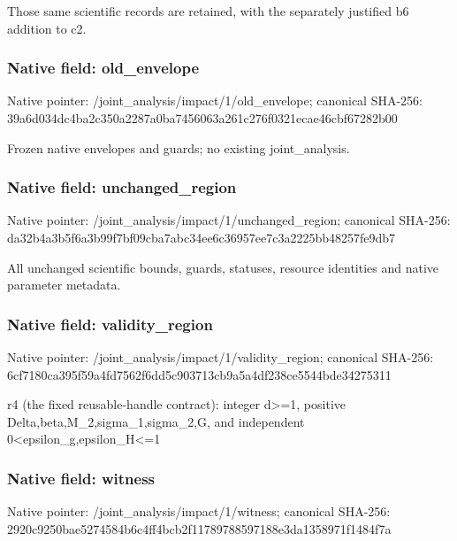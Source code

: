 \documentclass[10pt,a4paper]{article}
\begin{document}
\begingroup\raggedright\sloppy Those same scientific records are retained,\allowbreak{} with the separately justified b6 addition to c2.\par\endgroup

\subsubsection{Native field: old\_\allowbreak{}envelope}
Native pointer: /joint\_\allowbreak{}analysis/impact/1/old\_\allowbreak{}envelope; canonical SHA-256: 39a6d034dc4ba2c350a2287a0ba7456063a261c276f0321ecae46cbf67282b00

\begingroup\raggedright\sloppy Frozen native envelopes and guards;\allowbreak{} no existing joint\_\allowbreak{}analysis.\par\endgroup

\subsubsection{Native field: unchanged\_\allowbreak{}region}
Native pointer: /joint\_\allowbreak{}analysis/impact/1/unchanged\_\allowbreak{}region; canonical SHA-256: da32b4a3b5f6a3b99f7bf09cba7abc34ee6c36957ee7c3a2225bb48257fe9db7

\begingroup\raggedright\sloppy All unchanged scientific bounds,\allowbreak{} guards,\allowbreak{} statuses,\allowbreak{} resource identities and native parameter metadata.\par\endgroup

\subsubsection{Native field: validity\_\allowbreak{}region}
Native pointer: /joint\_\allowbreak{}analysis/impact/1/validity\_\allowbreak{}region; canonical SHA-256: 6cf7180ca395f59a4fd7562f6dd5c903713cb9a5a4df238ce5544bde34275311

\begingroup\raggedright\sloppy r4 (the fixed reusable-handle contract):\allowbreak{} integer d>=\allowbreak{}1,\allowbreak{} positive Delta,\allowbreak{}beta,\allowbreak{}M\_\allowbreak{}2,\allowbreak{}sigma\_\allowbreak{}1,\allowbreak{}sigma\_\allowbreak{}2,\allowbreak{}G,\allowbreak{} and independent 0<epsilon\_\allowbreak{}g,\allowbreak{}epsilon\_\allowbreak{}H<=\allowbreak{}1\par\endgroup

\subsubsection{Native field: witness}
Native pointer: /joint\_\allowbreak{}analysis/impact/1/witness; canonical SHA-256: 2920c9250bae5274584b6c4ff4bcb2f11789788597188e3da1358971f1484f7a
\end{document}
